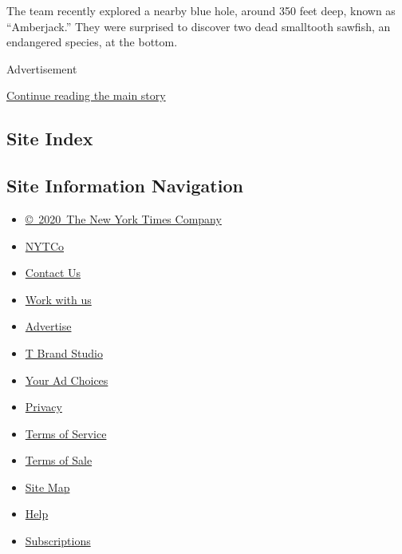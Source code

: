 The team recently explored a nearby blue hole, around 350 feet deep,
known as ``Amberjack.'' They were surprised to discover two dead
smalltooth sawfish, an endangered species, at the bottom.

Advertisement

\protect\hyperlink{after-bottom}{Continue reading the main story}

\hypertarget{site-index}{%
\subsection{Site Index}\label{site-index}}

\hypertarget{site-information-navigation}{%
\subsection{Site Information
Navigation}\label{site-information-navigation}}

\begin{itemize}
\tightlist
\item
  \href{https://help.nytimes.com/hc/en-us/articles/115014792127-Copyright-notice}{©~2020~The
  New York Times Company}
\end{itemize}

\begin{itemize}
\tightlist
\item
  \href{https://www.nytco.com/}{NYTCo}
\item
  \href{https://help.nytimes.com/hc/en-us/articles/115015385887-Contact-Us}{Contact
  Us}
\item
  \href{https://www.nytco.com/careers/}{Work with us}
\item
  \href{https://nytmediakit.com/}{Advertise}
\item
  \href{http://www.tbrandstudio.com/}{T Brand Studio}
\item
  \href{https://www.nytimes.com/privacy/cookie-policy\#how-do-i-manage-trackers}{Your
  Ad Choices}
\item
  \href{https://www.nytimes.com/privacy}{Privacy}
\item
  \href{https://help.nytimes.com/hc/en-us/articles/115014893428-Terms-of-service}{Terms
  of Service}
\item
  \href{https://help.nytimes.com/hc/en-us/articles/115014893968-Terms-of-sale}{Terms
  of Sale}
\item
  \href{https://spiderbites.nytimes.com}{Site Map}
\item
  \href{https://help.nytimes.com/hc/en-us}{Help}
\item
  \href{https://www.nytimes.com/subscription?campaignId=37WXW}{Subscriptions}
\end{itemize}
